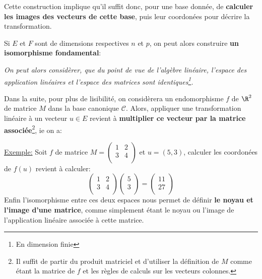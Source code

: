 Cette construction implique qu'il suffit donc, pour une base donnée, de \textbf{calculer les images des vecteurs de cette base}, puis leur coordonées pour décrire la transformation.\<

Si \(E\) et \(F\) sont de dimensions respectives \(n\) et \(p\), on peut alors construire \textbf{un isomorphisme fondamental}:

\begin{center}
   \textit{On peut alors considèrer, que du point de vue de l'algèbre linéaire, l'espace des application linéaires et l'espace des matrices sont identiques\footnote[1]{En dimension finie}.}
\end{center}

Dans la suite, pour plus de lisibilité, on considèrera un endomorphisme \(f\) de \(\R^2\) de matrice \(M\) dans la base canonique \(\mathscr{C}\).
Alors, appliquer une transformation linéaire à un vecteur \(u \in E\) revient à \textbf{multiplier ce vecteur par la matrice associée}\footnote[2]{Il suffit de partir du produit matriciel et d'utiliser la définition de \(M\) comme étant la matrice de \(f\) et les règles de calculs sur les vecteurs colonnes.}, ie on a:

\underline{Exemple:} Soit \(f\) de matrice 
\(M = \begin{pmatrix}
   1 & 2\\
   3 & 4\\
\end{pmatrix}\) 
et \(u = (5, 3)\), calculer les coordonées de \(f(u)\) revient à calculer:
\[
   \begin{pmatrix}
      1 & 2\\
      3 & 4\\
   \end{pmatrix}
   \begin{pmatrix}
      5 \\
      3 \\
   \end{pmatrix} =
   \begin{pmatrix}
      11 \\
      27 \\
   \end{pmatrix} 
\]
Enfin l'isomorphisme entre ces deux espaces nous permet de définir \textbf{le noyau et l'image d'une matrice}, comme simplement étant le noyau ou l'image de l'application linéaire associée à cette matrice.

